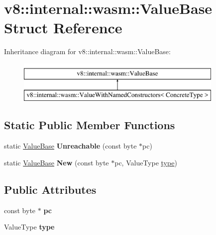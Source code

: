 \hypertarget{structv8_1_1internal_1_1wasm_1_1ValueBase}{}\section{v8\+:\+:internal\+:\+:wasm\+:\+:Value\+Base Struct Reference}
\label{structv8_1_1internal_1_1wasm_1_1ValueBase}
Inheritance diagram for v8\+:\+:internal\+:\+:wasm\+:\+:Value\+Base\+:\begin{figure}[H]
\begin{center}
\leavevmode
\includegraphics[height=2.000000cm]{structv8_1_1internal_1_1wasm_1_1ValueBase}
\end{center}
\end{figure}
\subsection*{Static Public Member Functions}
\begin{DoxyCompactItemize}
\item 
\mbox{\label{structv8_1_1internal_1_1wasm_1_1ValueBase_aad8774a0108c7e3489af237d584e7f59}} 
static \mbox{\hyperlink{structv8_1_1internal_1_1wasm_1_1ValueBase}{Value\+Base}} {\bfseries Unreachable} (const byte $\ast$pc)
\item 
\mbox{\label{structv8_1_1internal_1_1wasm_1_1ValueBase_a7faffc4634c84e96bfe82dbe222a970d}} 
static \mbox{\hyperlink{structv8_1_1internal_1_1wasm_1_1ValueBase}{Value\+Base}} {\bfseries New} (const byte $\ast$pc, Value\+Type \mbox{\hyperlink{classstd_1_1conditional_1_1type}{type}})
\end{DoxyCompactItemize}
\subsection*{Public Attributes}
\begin{DoxyCompactItemize}
\item 
\mbox{\label{structv8_1_1internal_1_1wasm_1_1ValueBase_a0056bf6548dc2d89bc12169c82d9159a}} 
const byte $\ast$ {\bfseries pc}
\item 
\mbox{\label{structv8_1_1internal_1_1wasm_1_1ValueBase_a1fa07736ff0c123482ee390f188ed603}} 
Value\+Type {\bfseries type}
\end{DoxyCompactItemize}


